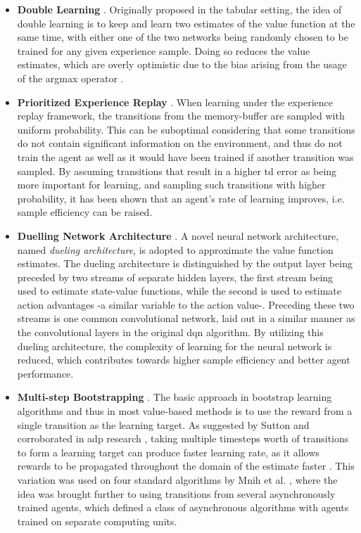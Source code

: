 \documentclass[../report.tex]{subfiles}
\begin{document}
\begin{itemize}
    \item \textbf{Double Learning} \cite{ddqn}. Originally proposed in the tabular setting, the idea of double learning is to keep and learn two estimates of the value function at the same time, with either one of the two networks being randomly chosen to be trained for any given experience sample. Doing so reduces the value estimates, which are overly optimistic due to the bias arising from the usage of the {\myfont argmax} operator \cite{double_q_learning}. 
    \item \textbf{Prioritized Experience Replay} \cite{prioritized_exp_replay}. When learning under the experience replay framework, the transitions from the memory-buffer are sampled with uniform probability. This can be suboptimal considering that some transitions do not contain significant information on the environment, and thus do not train the agent as well as it would have been trained if another transition was sampled. By assuming transitions that result in a higher \ac{td} error as being more important for learning, and sampling such transitions with higher probability, it has been shown that an agent's rate of learning improves, i.e. sample efficiency can be raised.
    \item \textbf{Duelling Network Architecture} \cite{dueling_architecture}. A novel neural network architecture, named \textit{dueling architecture}, is adopted to approximate the value function estimates. The dueling architecture is distinguished by the output layer being preceded by two streams of separate hidden layers, the first stream being used to estimate state-value functions, while the second is used to estimate action advantages -a similar variable to the action value-. Preceding these two streams is one common convolutional network, laid out in a similar manner as the convolutional layers in the original \ac{dqn} algorithm. By utilizing this dueling architecture, the complexity of learning for the neural network is reduced, which contributes towards higher sample efficiency and better agent performance.
    \item \textbf{Multi-step Bootstrapping} \cite{intro_rl, a3c}. The basic approach in bootstrap learning algorithms and thus in most value-based methods is to use the reward from a single transition as the learning target. As suggested by Sutton \cite{Sutton_multi_step} and corroborated in \ac{adp} research \cite{mshdp_og}, taking multiple timesteps worth of transitions to form a learning target can produce faster learning rate, as it allows rewards to be propagated throughout the domain of the estimate faster \cite{Sutton_multi_step}. This variation was used on four standard algorithms by Mnih et al. \cite{a3c}, where the idea was brought further to using transitions from several asynchronously trained agents, which defined a class of asynchronous algorithms with agents trained on separate computing units.

\end{itemize}
\end{document}
